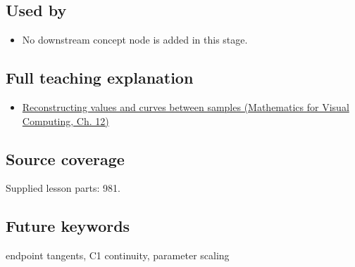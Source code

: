 \subsection{Used by}\label{appendix-db3aef8f2fd6-used-by}

\begin{itemize}
\tightlist
\item
  No downstream concept node is added in this stage.
\end{itemize}

\subsection{Full teaching explanation}\label{appendix-db3aef8f2fd6-full-teaching-explanation}

\begin{itemize}
\tightlist
\item
  \href{../02-Mathematics-for-Visual-Computing/main.pdf\#nameddest=02-foundations-ii-ch028-reconstructing-values-and-curves-between-samples}{Reconstructing values and curves between samples (Mathematics for Visual Computing, Ch. 12)}
\end{itemize}

\subsection{Source coverage}\label{appendix-db3aef8f2fd6-source-coverage}

Supplied lesson parts: 981.

\subsection{Future keywords}\label{appendix-db3aef8f2fd6-future-keywords}

endpoint tangents, C1 continuity, parameter scaling
